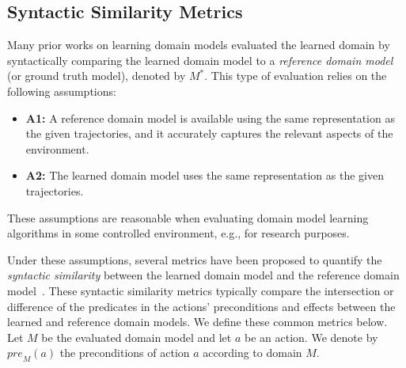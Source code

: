 \documentclass{article}
\theoremstyle{definition}
\theoremstyle{remark}
\newcommand{\realm}{{\ensuremath{M^*}}\xspace}
\newcommand{\pre}{\ensuremath{\textit{pre}}\xspace}
\newif\ifaddcomments
\newcommand{\roni}[1]{\ifaddcomments{\textcolor{red}{[Roni: #1]}}\fi}
\newcommand{\cm}[1]{\ifaddcomments{\textcolor{olive}{[Christian: #1]}}\fi}
\begin{document}
\subsection{Syntactic Similarity Metrics}
Many prior works on learning domain models evaluated the learned domain by syntactically comparing the learned domain model to a \emph{reference domain model} (or ground truth model), denoted by $\realm$. This type of evaluation relies on the following assumptions:
\begin{itemize}
    \item \textbf{A1:} A reference domain model 
    is available using the same representation as the given trajectories, and it accurately captures the relevant aspects of the environment. 
    \item \textbf{A2:} The learned domain model uses the same representation as the given trajectories. 
\end{itemize}
These assumptions are reasonable when evaluating domain model learning algorithms in some controlled environment, e.g., for research purposes. 



Under these assumptions, several metrics have been proposed to quantify the \emph{syntactic similarity} between the learned domain model and the reference domain model~\citep{aineto2019learning,mordoch2023safe,xi2024neuro,Oswald2024DLLMDomainModeling}.
These syntactic similarity metrics typically compare the intersection or difference of the predicates in the actions' preconditions and effects between the learned and reference domain models. We define these common metrics below. 
Let $M$ be the evaluated domain model and let $a$ be an action. We denote by $\pre_M(a)$ the preconditions of action $a$ according to domain $M$.

\end{document}
